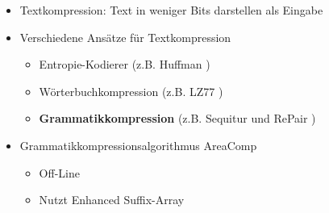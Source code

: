 \begin{frame}

	\begin{itemize}
		\item<1-> Textkompression: Text in weniger Bits darstellen als Eingabe
		\item<2-> Verschiedene Ansätze für Textkompression 
		\begin{itemize}
			\item<3-> Entropie-Kodierer (z.B. Huffman \cite{huffman_method_1952})
			\item<4-> Wörterbuchkompression (z.B. LZ77 \cite{ziv_universal_1977})
			\item<5-> \textbf{Grammatikkompression} (z.B. Sequitur \cite{nevill-manning_identifying_1997} und RePair \cite{larsson_off-line_2000})
		\end{itemize}
		\item<6-> Grammatikkompressionsalgorithmus AreaComp \begin{itemize}
			\item Off-Line
			\item Nutzt Enhanced Suffix-Array
		\end{itemize}
	\end{itemize}
\end{frame}